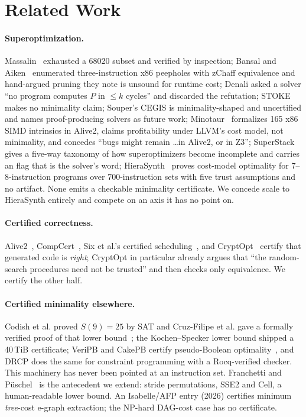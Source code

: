 \section{Related Work}
\label{sec:related}

\paragraph{Superoptimization.} Massalin~\cite{massalin} exhausted a 68020 subset and verified by inspection; Bansal and Aiken~\cite{bansalaiken} enumerated three-instruction x86 peepholes with zChaff equivalence and hand-argued pruning they note is unsound for runtime cost; Denali asked a solver \enquote{no program computes $P$ in $\le k$ cycles} and discarded the refutation; STOKE makes no minimality claim; Souper's CEGIS is minimality-shaped and uncertified and names proof-producing solvers as future work; Minotaur~\cite{minotaur} formalizes 165 x86 SIMD intrinsics in Alive2, claims profitability under LLVM's cost model, not minimality, and concedes \enquote{bugs might remain \ldots in Alive2, or in Z3}; SuperStack~\cite{superstack} gives a five-way taxonomy of how superoptimizers become incomplete and carries an  flag that is the solver's word; HieraSynth~\cite{hierasynth} proves cost-model optimality for 7--8-instruction programs over 700-instruction sets with five trust assumptions and no artifact. None emits a checkable minimality certificate. We concede scale to HieraSynth entirely and compete on an axis it has no point on.

\paragraph{Certified correctness.} Alive2~\cite{alive2}, CompCert~\cite{compcert}, Six et al.'s certified scheduling~\cite{six2020}, and CryptOpt~\cite{cryptopt} certify that generated code is \emph{right}; CryptOpt in particular already argues that \enquote{the random-search procedures need not be trusted} and then checks only equivalence. We certify the other half.

\paragraph{Certified minimality elsewhere.} Codish et al. proved $S(9)=25$ by SAT and Cruz-Filipe et al. gave a formally verified proof of that lower bound~\cite{sortingnetworks}; the Kochen--Specker lower bound shipped a 40\,TiB certificate; VeriPB and CakePB certify pseudo-Boolean optimality~\cite{veripb}, and DRCP does the same for constraint programming with a Rocq-verified checker. This machinery has never been pointed at an instruction set. Franchetti and Püschel~\cite{franchetti2008} is the antecedent we extend: stride permutations, SSE2 and Cell, a human-readable lower bound. An Isabelle/AFP entry (2026) certifies minimum \emph{tree}-cost e-graph extraction; the NP-hard DAG-cost case has no certificate.

